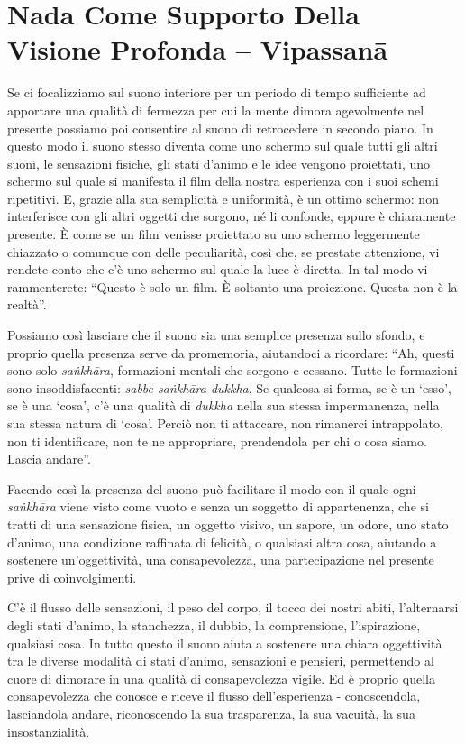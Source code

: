 \section{Nada Come Supporto Della Visione Profonda -- Vipassanā}

Se ci focalizziamo sul suono interiore per un periodo di tempo
sufficiente ad apportare una qualità di fermezza per cui la mente dimora
agevolmente nel presente possiamo poi consentire al suono di retrocedere
in secondo piano. In questo modo il suono stesso diventa come uno
schermo sul quale tutti gli altri suoni, le sensazioni fisiche, gli
stati d'animo e le idee vengono proiettati, uno schermo sul quale si
manifesta il film della nostra esperienza con i suoi schemi ripetitivi.
E, grazie alla sua semplicità e uniformità, è un ottimo schermo: non
interferisce con gli altri oggetti che sorgono, né li confonde, eppure è
chiaramente presente. È come se un film venisse proiettato su uno
schermo leggermente chiazzato o comunque con delle peculiarità, così
che, se prestate attenzione, vi rendete conto che c'è uno schermo sul
quale la luce è diretta. In tal modo vi rammenterete: ``Questo è solo un
film. È soltanto una proiezione. Questa non è la realtà''.

Possiamo così lasciare che il suono sia una semplice presenza sullo
sfondo, e proprio quella presenza serve da promemoria, aiutandoci a
ricordare: ``Ah, questi sono solo \emph{saṅkhāra}, formazioni mentali
che sorgono e cessano. Tutte le formazioni sono insoddisfacenti:
\emph{sabbe saṅkhāra dukkha}. Se qualcosa si forma, se è un `esso', se è
una `cosa', c'è una qualità di \emph{dukkha} nella sua stessa
impermanenza, nella sua stessa natura di `cosa'. Perciò non ti
attaccare, non rimanerci intrappolato, non ti identificare, non te ne
appropriare, prendendola per chi o cosa siamo. Lascia andare''.

Facendo così la presenza del suono può facilitare il modo con il quale
ogni \emph{saṅkhāra} viene visto come vuoto e senza un soggetto di
appartenenza, che si tratti di una sensazione fisica, un oggetto visivo,
un sapore, un odore, uno stato d'animo, una condizione raffinata di
felicità, o qualsiasi altra cosa, aiutando a sostenere un'oggettività,
una consapevolezza, una partecipazione nel presente prive di
coinvolgimenti.

C'è il flusso delle sensazioni, il peso del corpo, il tocco dei nostri
abiti, l'alternarsi degli stati d'animo, la stanchezza, il dubbio, la
comprensione, l'ispirazione, qualsiasi cosa. In tutto questo il suono
aiuta a sostenere una chiara oggettività tra le diverse modalità di
stati d'animo, sensazioni e pensieri, permettendo al cuore di dimorare
in una qualità di consapevolezza vigile. Ed è proprio quella
consapevolezza che conosce e riceve il flusso dell'esperienza -
conoscendola, lasciandola andare, riconoscendo la sua trasparenza, la
sua vacuità, la sua insostanzialità.

